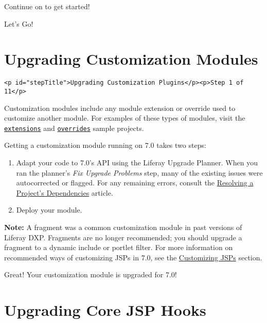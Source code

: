 Continue on to get started!

Let's Go!{}

\chapter{Upgrading Customization
Modules}\label{upgrading-customization-modules}

\begin{verbatim}
<p id="stepTitle">Upgrading Customization Plugins</p><p>Step 1 of 11</p>
\end{verbatim}

Customization modules include any module extension or override used to
customize another module. For examples of these types of modules, visit
the
\href{https://github.com/liferay/liferay-blade-samples/tree/master/liferay-workspace/extensions}{\texttt{extensions}}
and
\href{https://github.com/liferay/liferay-blade-samples/tree/master/liferay-workspace/overrides}{\texttt{overrides}}
sample projects.

Getting a customization module running on 7.0 takes two steps:

\begin{enumerate}
\def\labelenumi{\arabic{enumi}.}
\item
  Adapt your code to 7.0's API using the Liferay Upgrade Planner. When
  you ran the planner's \emph{Fix Upgrade Problems} step, many of the
  existing issues were autocorrected or flagged. For any remaining
  errors, consult the
  \href{/docs/7-2/tutorials/-/knowledge_base/t/resolving-a-projects-dependencies}{Resolving
  a Project's Dependencies} article.
\item
  Deploy your module.
\end{enumerate}

\noindent\hrulefill

\textbf{Note:} A fragment was a common customization module in past
versions of Liferay DXP. Fragments are no longer recommended; you should
upgrade a fragment to a dynamic include or portlet filter. For more
information on recommended ways of customizing JSPs in 7.0, see the
\href{/docs/7-2/customization/-/knowledge_base/c/customizing-jsps}{Customizing
JSPs} section.

\noindent\hrulefill

Great! Your customization module is upgraded for 7.0!

\chapter{Upgrading Core JSP Hooks}\label{upgrading-core-jsp-hooks}

